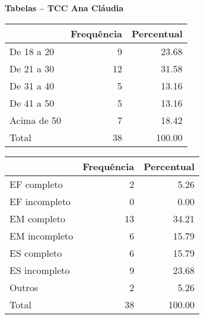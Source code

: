 \documentclass[a4paper, 12pt, openright, oneside, german, french, english, brazil, article]{abntex2}
\begin{document}
	\begin{center}
			\textbf{Tabelas -- TCC Ana Cláudia}
	\end{center}
	
	\begin{table}[ht]
		\ibgetab{
		\centering
	}
		{\begin{tabular}{lrr}
			\hline
			& Frequência & Percentual \\ 
			\hline
			De 18 a 20 &   9 & 23.68 \\ 
			De 21 a 30 &  12 & 31.58 \\ 
			De 31 a 40 &   5 & 13.16 \\ 
			De 41 a 50 &   5 & 13.16 \\ 
			Acima de 50 &   7 & 18.42 \\ 
			Total &  38 & 100.00 \\ 
			\hline
		\end{tabular}
	}
	{}
	\end{table}
	
	\begin{table}[ht]
		\ibgetab{
		\centering
	}
		{\begin{tabular}{lrr}
			\hline
			& Frequência & Percentual \\ 
			\hline
			EF completo &   2 & 5.26 \\ 
			EF incompleto &   0 & 0.00 \\ 
			EM completo &  13 & 34.21 \\ 
			EM incompleto &   6 & 15.79 \\ 
			ES completo &   6 & 15.79 \\ 
			ES incompleto &   9 & 23.68 \\ 
			Outros &   2 & 5.26 \\ 
			Total &  38 & 100.00 \\ 
			\hline
		\end{tabular}
	}
	{}
	\end{table}
	
\end{document}
